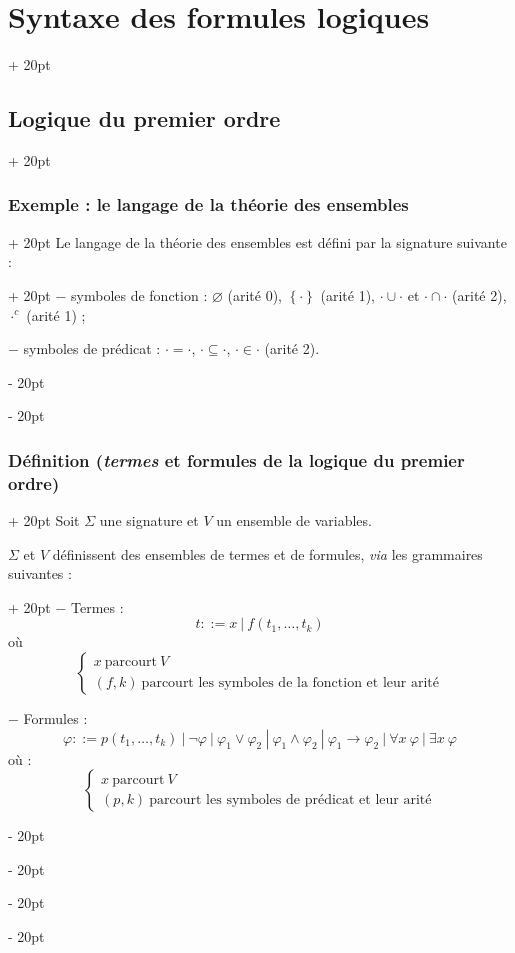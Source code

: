 \documentclass[a4paper, 12pt, twoside]{article}
\newcommand{\set}[1]{\left\{ #1 \right\}}
\newcommand{\eqsys}[2]{\begin{cases} #1 \\ #2 \end{cases}}
\newcommand{\ind}[1][20pt]{\advance\leftskip + #1}
\newcommand{\deind}[1][20pt]{\advance\leftskip - #1}
\newenvironment{indt}[2][20pt]{#2 \par \ind[#1]}{\par \deind} %
\begin{document}
\begin{indt}{\section{Syntaxe des formules logiques}}
\begin{indt}{\subsection{Logique du premier ordre}}
            \vspace{12pt}
            
            \begin{indt}{\subsubsection{Exemple : le langage de la théorie des ensembles}}
                \begin{indt}{Le langage de la théorie des ensembles est défini par la signature suivante :}
                    $-$ symboles de fonction : $\varnothing$ (arité 0), $\set \cdot$ (arité 1), $\cdot \cup \cdot$ et $\cdot \cap \cdot$ (arité 2), $\cdot^c$ (arité 1) ;
                    
                    $-$ symboles de prédicat : $\cdot = \cdot$, $\cdot \subseteq \cdot$, $\cdot \in \cdot$ (arité 2).
                \end{indt}
            \end{indt}
            
            \vspace{12pt}
            
            \begin{indt}{\subsubsection{Définition (\textit{termes} et formules de la logique du premier ordre)}}
                Soit $\Sigma$ une signature et $V$ un ensemble de variables.
                
                \begin{indt}{$\Sigma$ et $V$ définissent des ensembles de termes et de formules, \textit{via} les grammaires suivantes :}
                    $-$ Termes :
                        \[
                            t ::= x\ |\ f(t_1, \ldots, t_k)
                        \]
                    où
                        \[
                            \eqsys{x\ \text{parcourt}\ V}{(f, k)\ \text{parcourt les symboles de la fonction et leur arité}}
                        \]
                    
                    $-$ Formules :
                        \[
                            \varphi ::=
                            p(t_1, \ldots, t_k)\
                            |\ \neg \varphi\
                            |\ \varphi_1 \vee \varphi_2\
                            |\ \varphi_1 \wedge \varphi_2\
                            |\ \varphi_1 \rightarrow \varphi_2\
                            |\ \forall x\ \varphi\
                            |\ \exists x\ \varphi
                        \]
                    où :
                        \[
                            \eqsys{x\ \text{parcourt}\ V}{(p, k)\ \text{parcourt les symboles de prédicat et leur arité}}
                        \]
                \end{indt}
                

\end{indt}
\end{indt}
\end{indt}
\end{document}
